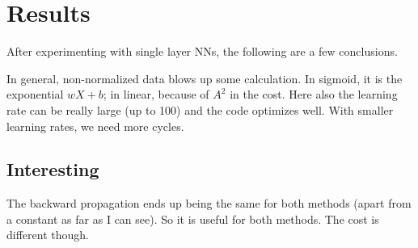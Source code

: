 \section{Results}
After experimenting with single layer NNs, the following are a few conclusions.

In general, non-normalized data blows up some calculation.
In sigmoid, it is the exponential $wX+b$; in linear, because of $A^2$ in the cost. Here also the learning rate can be really large (up to 100) and the code optimizes well. With smaller learning rates, we need more cycles.

\subsection{Interesting}
The backward propagation ends up being the same for both methods (apart from a constant as far as I can see). So it is useful for both methods. The cost is different though.

